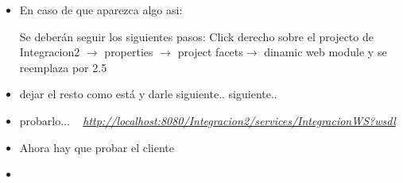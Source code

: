 \documentclass[12pt]{article}
\begin{document}
\begin{itemize}
\begin{minipage}[t]{\linewidth}
          \medskip
          \textbf{As\'i deber\'ia verse, tiene q decir \emph{Apache Axis2}!} \ \newline
          si no dice.. clic y seleccionar Axis2
          
    \end{minipage}
   \item
          En caso de que aparezca algo asi:
            \raggedright

          \medskip
          
          Se deber\'an seguir los siguientes pasos:
          Click derecho sobre el projecto de Integracion2 $\rightarrow$ properties $\rightarrow$  project facets$\rightarrow$ dinamic web module y se reemplaza por 2.5
\item dejar el resto como est\'a y darle siguiente.. siguiente..
\item probarlo... \ \newline
\textit{\href{http://localhost:8080/Integracion2/services/IntegracionWS?wsdl} {http://localhost:8080/Integracion2/services/IntegracionWS?wsdl}}
\item Ahora hay que probar el cliente
\item \begin{minipage}[t]{\linewidth}
          \raggedright


\end{minipage}
\end{itemize}
\end{document}
